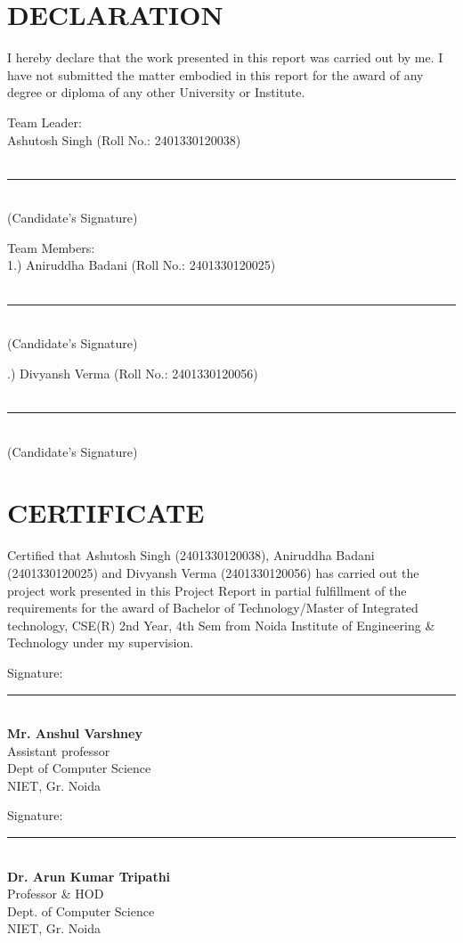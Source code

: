 \documentclass[14pt,a4paper]{extreport}
\begin{document}
\chapter*{DECLARATION}
I hereby declare that the work presented in this report was carried out by me. I have not submitted the matter embodied in this report for the award of any degree or diploma of any other University or Institute.

\vspace{2cm}
\noindent
Team Leader: \\
Ashutosh Singh (Roll No.: 2401330120038) \\
\vspace{1cm}\\
\rule{5cm}{0.4pt} \\
(Candidate's Signature)

\vspace{1cm}
\noindent
Team Members: \\
1.) Aniruddha Badani (Roll No.: 2401330120025) \\
\vspace{1cm}\\
\rule{5cm}{0.4pt} \\
(Candidate's Signature)

\vspace{1cm}
.) Divyansh Verma (Roll No.: 2401330120056) \\
\vspace{1cm}\\
\rule{5cm}{0.4pt} \\
(Candidate's Signature)


\chapter*{CERTIFICATE}
Certified that Ashutosh Singh (2401330120038), Aniruddha Badani (2401330120025) and Divyansh Verma (2401330120056) has carried out the project work presented in this Project Report in partial fulfillment of the requirements for the award of Bachelor of Technology/Master of Integrated technology, CSE(R) 2nd Year, 4th Sem from Noida Institute of Engineering \& Technology under my supervision.

\vspace{3cm}
\noindent
\begin{minipage}{0.5\textwidth}
Signature: \rule{4cm}{0.4pt} \\
\textbf{Mr. Anshul Varshney} \\
Assistant professor \\
Dept of Computer Science \\
NIET, Gr. Noida
\end{minipage}
\begin{minipage}{0.5\textwidth}
Signature: \rule{4cm}{0.4pt} \\
\textbf{Dr. Arun Kumar Tripathi} \\
Professor \& HOD \\
Dept. of Computer Science \\
NIET, Gr. Noida
\end{minipage}
\end{document}

